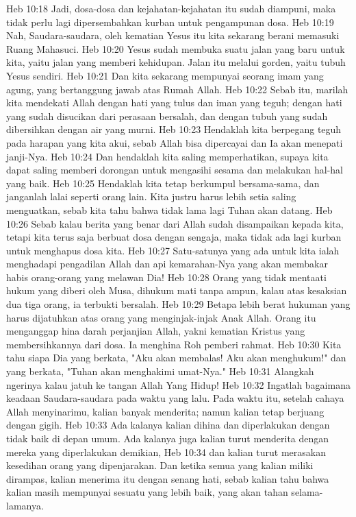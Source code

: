 Heb 10:18  Jadi, dosa-dosa dan kejahatan-kejahatan itu sudah diampuni, maka tidak perlu lagi dipersembahkan kurban untuk pengampunan dosa.
Heb 10:19  Nah, Saudara-saudara, oleh kematian Yesus itu kita sekarang berani memasuki Ruang Mahasuci.
Heb 10:20  Yesus sudah membuka suatu jalan yang baru untuk kita, yaitu jalan yang memberi kehidupan. Jalan itu melalui gorden, yaitu tubuh Yesus sendiri.
Heb 10:21  Dan kita sekarang mempunyai seorang imam yang agung, yang bertanggung jawab atas Rumah Allah.
Heb 10:22  Sebab itu, marilah kita mendekati Allah dengan hati yang tulus dan iman yang teguh; dengan hati yang sudah disucikan dari perasaan bersalah, dan dengan tubuh yang sudah dibersihkan dengan air yang murni.
Heb 10:23  Hendaklah kita berpegang teguh pada harapan yang kita akui, sebab Allah bisa dipercayai dan Ia akan menepati janji-Nya.
Heb 10:24  Dan hendaklah kita saling memperhatikan, supaya kita dapat saling memberi dorongan untuk mengasihi sesama dan melakukan hal-hal yang baik.
Heb 10:25  Hendaklah kita tetap berkumpul bersama-sama, dan janganlah lalai seperti orang lain. Kita justru harus lebih setia saling menguatkan, sebab kita tahu bahwa tidak lama lagi Tuhan akan datang.
Heb 10:26  Sebab kalau berita yang benar dari Allah sudah disampaikan kepada kita, tetapi kita terus saja berbuat dosa dengan sengaja, maka tidak ada lagi kurban untuk menghapus dosa kita.
Heb 10:27  Satu-satunya yang ada untuk kita ialah menghadapi pengadilan Allah dan api kemarahan-Nya yang akan membakar habis orang-orang yang melawan Dia!
Heb 10:28  Orang yang tidak mentaati hukum yang diberi oleh Musa, dihukum mati tanpa ampun, kalau atas kesaksian dua tiga orang, ia terbukti bersalah.
Heb 10:29  Betapa lebih berat hukuman yang harus dijatuhkan atas orang yang menginjak-injak Anak Allah. Orang itu menganggap hina darah perjanjian Allah, yakni kematian Kristus yang membersihkannya dari dosa. Ia menghina Roh pemberi rahmat.
Heb 10:30  Kita tahu siapa Dia yang berkata, "Aku akan membalas! Aku akan menghukum!" dan yang berkata, "Tuhan akan menghakimi umat-Nya."
Heb 10:31  Alangkah ngerinya kalau jatuh ke tangan Allah Yang Hidup!
Heb 10:32  Ingatlah bagaimana keadaan Saudara-saudara pada waktu yang lalu. Pada waktu itu, setelah cahaya Allah menyinarimu, kalian banyak menderita; namun kalian tetap berjuang dengan gigih.
Heb 10:33  Ada kalanya kalian dihina dan diperlakukan dengan tidak baik di depan umum. Ada kalanya juga kalian turut menderita dengan mereka yang diperlakukan demikian,
Heb 10:34  dan kalian turut merasakan kesedihan orang yang dipenjarakan. Dan ketika semua yang kalian miliki dirampas, kalian menerima itu dengan senang hati, sebab kalian tahu bahwa kalian masih mempunyai sesuatu yang lebih baik, yang akan tahan selama-lamanya.
